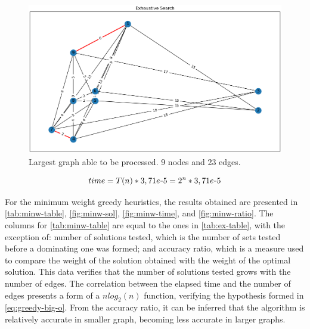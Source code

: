 \begin{figure}[!ht]
    \centering
    \includegraphics[width=1\linewidth]{figs/fig-9-0.5-exhaustive}
    \caption{Largest graph able to be processed. 9 nodes and 23 edges.}
    \label{fig:9-05-ex}
\end{figure}

\begin{equation}
    time = T(n) * 3,71e\scalebox{0.5}[1.0]{\( - \)}5 = 2^n * 3,71e\scalebox{0.5}[1.0]{\( - \)}5
    \label{eq:ex-time-calc}
\end{equation}

\newpage

For the minimum weight greedy heuristics, the results obtained are presented in \autoref{tab:minw-table}, \autoref{fig:minw-sol}, \autoref{fig:minw-time}, and \autoref{fig:minw-ratio}. 
The columns for \autoref{tab:minw-table} are equal to the ones in \autoref{tab:ex-table}, with the exception of: number of solutions tested, which is the number of sets tested before a dominating one was formed; and accuracy ratio, which is a measure used to compare the weight of the solution obtained with the weight of the optimal solution. 
This data verifies that the number of solutions tested grows with the number of edges.
The correlation between the elapsed time and the number of edges presents a form of a $nlog_2(n)$ function, verifying the hypothesis formed in \autoref{eq:greedy-big-o}.
From the accuracy ratio, it can be inferred that the algorithm is relatively accurate in smaller graph, becoming less accurate in larger graphs.


